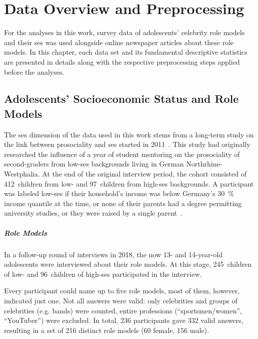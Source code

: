 \renewcommand{\imagepath}{../30-data/img}

\chapter{Data Overview and Preprocessing}
For the analyses in this work, survey data of adolescents' celebrity role models and their \gls{ses} was used alongside online newspaper articles about these role models. In this chapter, each data set and its fundamental descriptive statistics are presented in details along with the respective preprocessing steps applied before the analyses.

\section{Adolescents' Socioeconomic Status and Role Models}
The \gls{ses} dimension of the data used in this work stems from a long-term study on the link between prosociality and \gls{ses} started in 2011~\autocite{kosse_formation_2020}. This study had originally researched the influence of a year of student mentoring on the prosociality of second-graders from low-\gls{ses} backgrounds living in German Northrhine-Westphalia. At the end of the original interview period, the cohort consisted of \SI{412}{children} from low- and \SI{97}{children} from high-\gls{ses} backgrounds. A participant was labeled low-\gls{ses} if their household's income was below Germany's \SI{30}{\percent} income quantile at the time, or none of their parents had a degree permitting university studies, or they were raised by a single parent~\autocite{kosse_formation_2020}.

\paragraph{Role Models}
In a follow-up round of interviews in 2018, the now 13- and 14-year-old adolescents were interviewed about their role models. At this stage, \SI{245}{children} of low- and \SI{96}{children} of high-\gls{ses} participated in the interview.

Every participant could name up to five role models, most of them, however, indicated just one. Not all answers were valid: only celebrities and groups of celebrities (e.g. bands) were counted, entire professions (``sportsmen/women'', ``YouTuber'') were excluded. In total, \SI{236}{} participants gave \SI{332}{} valid answers, resulting in a set of \SI{216}{} distinct role models (\SI{60}{} female, \SI{156}{} male).

